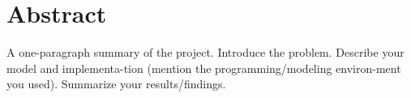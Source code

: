 
\section*{Abstract}

A one-paragraph summary of the project. Introduce the problem. Describe your model
and implementa-tion (mention the programming/modeling environ-ment you used).
Summarize your results/findings.
